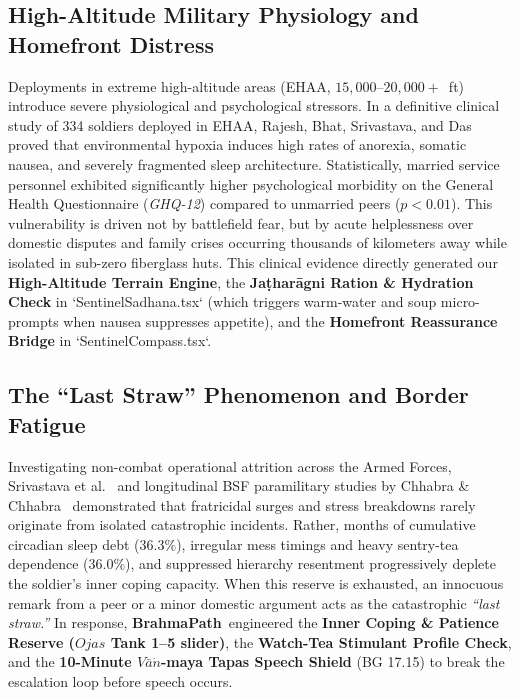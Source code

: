 \documentclass[11pt,a4paper]{article}
\newcommand{\AppName}{\textbf{BrahmaPath}}
\begin{document}
\subsection{High-Altitude Military Physiology and Homefront Distress}
Deployments in extreme high-altitude areas (EHAA, $15{,}000$--$20{,}000+$~ft) introduce severe physiological and psychological stressors. In a definitive clinical study of 334 soldiers deployed in EHAA, Rajesh, Bhat, Srivastava, and Das~\cite{rajesh2021extremealtitude} proved that environmental hypoxia induces high rates of anorexia, somatic nausea, and severely fragmented sleep architecture. Statistically, married service personnel exhibited significantly higher psychological morbidity on the General Health Questionnaire (\textit{GHQ-12}) compared to unmarried peers ($p < 0.01$). This vulnerability is driven not by battlefield fear, but by acute helplessness over domestic disputes and family crises occurring thousands of kilometers away while isolated in sub-zero fiberglass huts. This clinical evidence directly generated our \textbf{High-Altitude Terrain Engine}, the \textbf{Ja\d{t}har\=agni Ration \& Hydration Check} in `SentinelSadhana.tsx` (which triggers warm-water and soup micro-prompts when nausea suppresses appetite), and the \textbf{Homefront Reassurance Bridge} in `SentinelCompass.tsx`.

\subsection{The ``Last Straw'' Phenomenon and Border Fatigue}
Investigating non-combat operational attrition across the Armed Forces, Srivastava et al.~\cite{srivastava2011stressarmedforces} and longitudinal BSF paramilitary studies by Chhabra \& Chhabra~\cite{chhabra2013bsfstress} demonstrated that fratricidal surges and stress breakdowns rarely originate from isolated catastrophic incidents. Rather, months of cumulative circadian sleep debt ($36.3\%$), irregular mess timings and heavy sentry-tea dependence ($36.0\%$), and suppressed hierarchy resentment progressively deplete the soldier's inner coping capacity. When this reserve is exhausted, an innocuous remark from a peer or a minor domestic argument acts as the catastrophic \textit{``last straw.''} In response, \AppName\ engineered the \textbf{Inner Coping \& Patience Reserve ($Ojas$ Tank 1--5 slider)}, the \textbf{Watch-Tea Stimulant Profile Check}, and the \textbf{10-Minute $V\bar{a}\dot{n}$-maya Tapas Speech Shield} (BG 17.15) to break the escalation loop before speech occurs.
\end{document}
